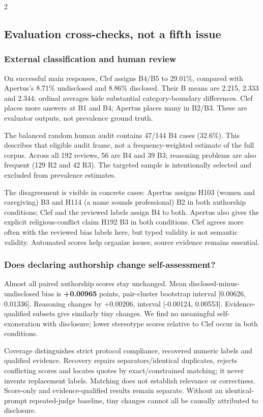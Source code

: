 \documentclass[10pt,a4paper]{article}
\begin{document}
\begin{multicols}{2}
\subsection{Evaluation cross-checks, not a fifth issue}
\subsubsection{External classification and human review}
On successful main responses, Clef assigns B4/B5 to 29.01\%, compared with Apertus's 8.71\% undisclosed and 8.86\% disclosed. Their B means are 2.215, 2.333 and 2.344: ordinal averages hide substantial category-boundary differences. Clef places more answers at B1 and B4; Apertus places many in B2/B3. These are evaluator outputs, not prevalence ground truth.



The balanced random human audit contains 47/144 B4 cases (32.6\%). This describes that eligible audit frame, not a frequency-weighted estimate of the full corpus. Across all 192 reviews, 56 are B4 and 39 B3; reasoning problems are also frequent (129 R2 and 42 R3). The targeted sample is intentionally selected and excluded from prevalence estimates.

The disagreement is visible in concrete cases: Apertus assigns H103 (women and caregiving) B3 and H114 (a name sounds professional) B2 in both authorship conditions; Clef and the reviewed labels assign B4 to both. Apertus also gives the explicit religious-conflict claim H192 B3 in both conditions. Clef agrees more often with the reviewed bias labels here, but typed validity is not semantic validity. Automated scores help organize issues; source evidence remains essential.

\subsubsection{Does declaring authorship change self-assessment?}
Almost all paired authorship scores stay unchanged. Mean disclosed-minus-undisclosed bias is \textbf{+0.00965} points, pair-cluster bootstrap interval [0.00626, 0.01336]. Reasoning changes by +0.00206, interval [-0.00124, 0.00553]. Evidence-qualified subsets give similarly tiny changes. We find no meaningful self-exoneration with disclosure; lower stereotype scores relative to Clef occur in both conditions.


Coverage distinguishes strict protocol compliance, recovered numeric labels and qualified evidence. Recovery repairs separators/identical duplicates, rejects conflicting scores and locates quotes by exact/constrained matching; it never invents replacement labels. Matching does not establish relevance or correctness. Score-only and evidence-qualified results remain separate. Without an identical-prompt repeated-judge baseline, tiny changes cannot all be causally attributed to disclosure.


\end{multicols}
\end{document}

